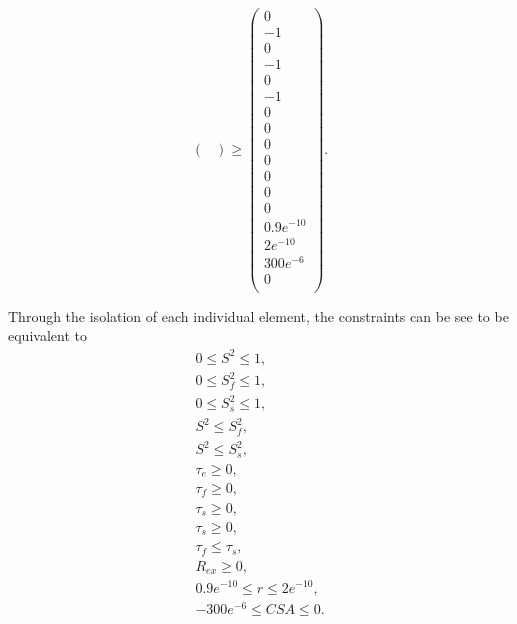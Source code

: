 \begin{htmlonly}
\begin{htmlonly}
\begin{equation}
\begin{pmatrix}
    \end{pmatrix}
    \geqslant
    \begin{pmatrix}
        0 \\
        -1 \\
        0 \\
        -1 \\
        0 \\
        -1 \\
        0 \\
        0 \\
        0 \\
        0 \\
        0 \\
        0 \\
        0 \\
        0.9e^{-10} \\
        2e^{-10} \\
        300e^{-6} \\
        0 \\
    \end{pmatrix}.
\end{equation}

\noindent  Through the isolation of each individual element, the constraints can be see to be equivalent to
\begin{subequations}
\begin{gather} 
    0 \leqslant S^2 \leqslant 1, \\
    0 \leqslant S^2_f \leqslant 1, \\
    0 \leqslant S^2_s \leqslant 1, \\
    S^2 \leqslant S^2_f, \\
    S^2 \leqslant S^2_s, \\
    \tau_e \geqslant 0, \\
    \tau_f \geqslant 0, \\
    \tau_s \geqslant 0, \\
    \tau_s \geqslant 0, \\
    \tau_f \leqslant \tau_s, \\
    R_{ex} \geqslant 0, \\
    0.9e^{-10} \leqslant r \leqslant 2e^{-10}, \\
    -300e^{-6} \leqslant CSA \leqslant 0.
\end{gather} 
\end{subequations}


\end{htmlonly}
\end{htmlonly}
